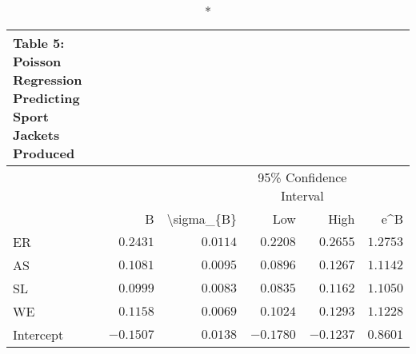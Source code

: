 \begin{longtable}{l|rrrrr}
\caption*{
{\large Table 5: Poisson Regression Predicting Sport Jackets Produced}
} \\ 
\toprule
\multicolumn{1}{l}{} &  &  & \multicolumn{2}{c}{95\% Confidence Interval} &  \\ 
\cmidrule(lr){4-5}
\multicolumn{1}{l}{} & B & \textbackslash{}sigma\_\{B\} & Low & High & e\textasciicircum{}B \\ 
\midrule
ER & $0.2431$ & $0.0114$ & $0.2208$ & $0.2655$ & $1.2753$ \\ 
AS & $0.1081$ & $0.0095$ & $0.0896$ & $0.1267$ & $1.1142$ \\ 
SL & $0.0999$ & $0.0083$ & $0.0835$ & $0.1162$ & $1.1050$ \\ 
WE & $0.1158$ & $0.0069$ & $0.1024$ & $0.1293$ & $1.1228$ \\ 
Intercept & $-0.1507$ & $0.0138$ & $-0.1780$ & $-0.1237$ & $0.8601$ \\ 
\bottomrule
\end{longtable}

